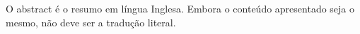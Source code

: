 O abstract é o resumo em língua Inglesa. 
Embora o conteúdo apresentado seja o mesmo, não deve ser a tradução literal.
